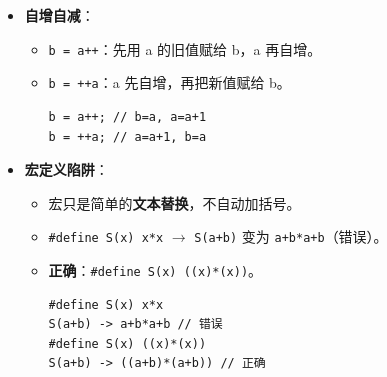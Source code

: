 \documentclass[a4paper,12pt]{article}
\begin{document}
\begin{itemize}
\begin{itemize}
\begin{lstlisting}
k = (n = 1) || (m = 2);
// n=1, k=1, m=0 (m=2 未执行)
\end{lstlisting}
    \end{itemize}
    \item \textbf{自增自减}：
    \begin{itemize}
        \item \texttt{b = a++}：先用 a 的旧值赋给 b，a 再自增。
        \item \texttt{b = ++a}：a 先自增，再把新值赋给 b。
\begin{lstlisting}
b = a++; // b=a, a=a+1
b = ++a; // a=a+1, b=a
\end{lstlisting}
    \end{itemize}
    \item \textbf{宏定义陷阱}：
    \begin{itemize}
        \item 宏只是简单的\textbf{文本替换}，不自动加括号。
        \item \texttt{\#define S(x) x*x} $\rightarrow$ \texttt{S(a+b)} 变为 \texttt{a+b*a+b}（错误）。
        \item \textbf{正确}：\texttt{\#define S(x) ((x)*(x))}。
\begin{lstlisting}
#define S(x) x*x
S(a+b) -> a+b*a+b // 错误
#define S(x) ((x)*(x))
S(a+b) -> ((a+b)*(a+b)) // 正确
\end{lstlisting}
    \end{itemize}
\end{itemize}
\end{document}
